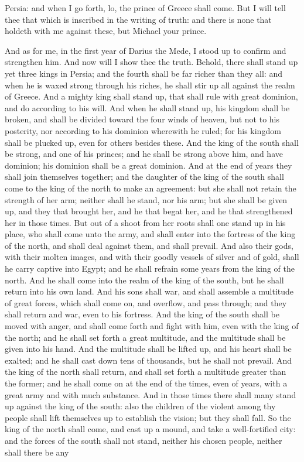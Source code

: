 Persia: and when I go forth, lo, the prince of Greece shall come. But I will tell thee that which is inscribed in the writing of truth: and there is none that holdeth with me against these, but Michael your prince. 

And as for me, in the first year of Darius the Mede, I stood up to confirm and strengthen him.  And now will I show thee the truth. Behold, there shall stand up yet three kings in Persia; and the fourth shall be far richer than they all: and when he is waxed strong through his riches, he shall stir up all against the realm of Greece. And a mighty king shall stand up, that shall rule with great dominion, and do according to his will. And when he shall stand up, his kingdom shall be broken, and shall be divided toward the four winds of heaven, but not to his posterity, nor according to his dominion wherewith he ruled; for his kingdom shall be plucked up, even for others besides these.  And the king of the south shall be strong, and one of his princes; and he shall be strong above him, and have dominion; his dominion shall be a great dominion. And at the end of years they shall join themselves together; and the daughter of the king of the south shall come to the king of the north to make an agreement: but she shall not retain the strength of her arm; neither shall he stand, nor his arm; but she shall be given up, and they that brought her, and he that begat her, and he that strengthened her in those times.  But out of a shoot from her roots shall one stand up in his place, who shall come unto the army, and shall enter into the fortress of the king of the north, and shall deal against them, and shall prevail. And also their gods, with their molten images, and with their goodly vessels of silver and of gold, shall he carry captive into Egypt; and he shall refrain some years from the king of the north. And he shall come into the realm of the king of the south, but he shall return into his own land.  And his sons shall war, and shall assemble a multitude of great forces, which shall come on, and overflow, and pass through; and they shall return and war, even to his fortress. And the king of the south shall be moved with anger, and shall come forth and fight with him, even with the king of the north; and he shall set forth a great multitude, and the multitude shall be given into his hand. And the multitude shall be lifted up, and his heart shall be exalted; and he shall cast down tens of thousands, but he shall not prevail. And the king of the north shall return, and shall set forth a multitude greater than the former; and he shall come on at the end of the times, even of years, with a great army and with much substance. And in those times there shall many stand up against the king of the south: also the children of the violent among thy people shall lift themselves up to establish the vision; but they shall fall. So the king of the north shall come, and cast up a mound, and take a well-fortified city: and the forces of the south shall not stand, neither his chosen people, neither shall there be any 